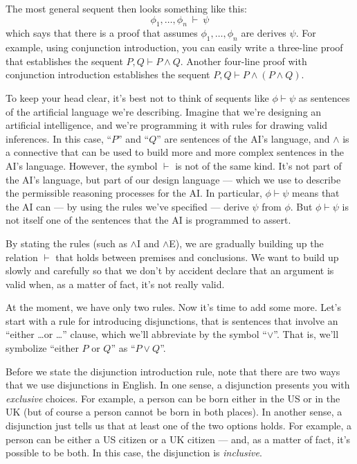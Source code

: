 The most general sequent then looks something like this:
\[ \phi _1,\dots ,\phi _n\: \vdash \:\psi \] which says that there is
a proof that assumes $\phi _1,\dots ,\phi _n$ are derives $\psi$.  For
example, using conjunction introduction, you can easily write a
three-line proof that establishes the sequent $P,Q\vdash P\wedge Q$.
Another four-line proof with conjunction introduction establishes the
sequent $P,Q\vdash P\wedge (P\wedge Q)$.

To keep your head clear, it's best not to think of sequents like
$\phi\vdash\psi$ as sentences of the artificial language we're
describing.  Imagine that we're designing an artificial intelligence,
and we're programming it with rules for drawing valid inferences.  In
this case, ``$P$'' and ``$Q$'' are sentences of the AI's language, and
$\wedge$ is a connective that can be used to build more and more
complex sentences in the AI's language.  However, the symbol $\vdash$
is not of the same kind.  It's not part of the AI's language, but part
of our design language --- which we use to describe the permissible
reasoning processes for the AI.  In particular, $\phi\vdash\psi$ means
that the AI can --- by using the rules we've specified --- derive
$\psi$ from $\phi$.  But $\phi\vdash\psi$ is not itself one of the
sentences that the AI is programmed to assert.

By stating the rules (such as $\wedge$I and $\wedge$E), we are
gradually building up the relation $\vdash$ that holds between
premises and conclusions.  We want to build up slowly and carefully so
that we don't by accident declare that an argument is valid when, as a
matter of fact, it's not really valid.

At the moment, we have only two rules.  Now it's time to add some
more.  Let's start with a rule for introducing disjunctions, that is
sentences that involve an ``either \dots or \dots '' clause, which
we'll abbreviate by the symbol ``$\vee$''.  That is, we'll symbolize
``either $P$ or $Q$'' as \mbox{``$P\vee Q$''}. 

Before we state the disjunction introduction rule, note that there are
two ways that we use disjunctions in English.  In one sense, a
\gls{disjunction} presents you with \textit{exclusive} choices.  For
example, a person can be born either in the US or in the UK (but of
course a person cannot be born in both places).  In another sense, a
disjunction just tells us that at least one of the two options holds.
For example, a person can be either a US citizen or a UK citizen ---
and, as a matter of fact, it's possible to be both.  In this case, the
disjunction is \textit{inclusive}.

